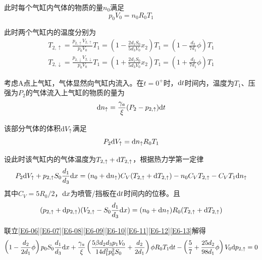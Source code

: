 \documentclass[10pt,a4paper,onecolumn,UTF8]{ctexart}
\begin{document}
	此时每个气缸内气体的物质的量$n_0$满足
	\begin{equation}\label{E6-08}
		p_0V_0=n_0R_0T_1
	\end{equation}
	
	此时两个气缸内的温度分别为
	\begin{equation}\label{E6-09}
		\begin{aligned}
			T_{2,\uparrow}=\frac{p_{2,\uparrow}V_{2,\uparrow}}{p_0V_0}T_1=\left(1-\frac{2d_1S_0}{5d_3V_0}x_2\right)T_1=\left(1-\frac{d_2}{7d_1}\phi\right)T_1\\
			T_{2,\downarrow}=\frac{p_{2,\downarrow}V_{2,\downarrow}}{p_0V_0}T_1=\left(1+\frac{2d_1S_0}{5d_3V_0}x_2\right)T_1=\left(1+\frac{d_2}{7d_1}\phi\right)T_1
		\end{aligned}
	\end{equation}
	
	考虑A点上气缸，气体显然向气缸内流入。在$t=0^+$时，$\mathrm{d} t$时间内，温度为$T_1$、压强为$P_2$的气体流入上气缸的物质的量为
	\begin{equation}\label{E6-10}
		\mathrm{d} n_{\uparrow}=\frac{\gamma_a}{\xi}(P_2-p_{2,\uparrow})\mathrm{d} t
	\end{equation}
	
	该部分气体的体积$\mathrm{d} V_{\uparrow}$满足
	\begin{equation}\label{E6-11}
		P_2\mathrm{d} V_{\uparrow}=\mathrm{d} n_{\uparrow}R_0T_1
	\end{equation}
	
	设此时该气缸内的气体温度为$T_{2,\uparrow}+\mathrm{d} T_{2,\uparrow}$，根据热力学第一定律
	\begin{equation}\label{E6-12}
		P_2\mathrm{d} V_{\uparrow}+p_{2,\uparrow}S_0\frac{d_1}{d_3}\mathrm{d} x=(n_0+\mathrm{d} n_{\uparrow})C_V(T_{2,\uparrow}+\mathrm{d} T_{2,\uparrow})-n_0C_VT_{2,\uparrow}-C_VT_1\mathrm{d} n_{\uparrow}
	\end{equation}
	其中$C_V=5R_0/2$，$\mathrm{d} x$为喷管/挡板在$\mathrm{d} t$时间内的位移。且
	\begin{equation}\label{E6-13}
		(p_{2,\uparrow}+\mathrm{d} p_{2,\uparrow})(V_{2,\uparrow}-S_0\frac{d_1}{d_3}\mathrm{d} x)=(n_0+\mathrm{d} n_{\uparrow})R_0(T_{2,\uparrow}+\mathrm{d} T_{2,\uparrow})
	\end{equation}
	
	联立\eqref{E6-06}\eqref{E6-07}\eqref{E6-08}\eqref{E6-09}\eqref{E6-10}\eqref{E6-11}\eqref{E6-12}\eqref{E6-13}解得
	\begin{equation}\label{E6-14}
		\left(1-\frac{d_2}{2d_1}\phi\right)p_0S_0\frac{d_1}{d_3}\mathrm{d} x+\frac{\gamma_a}{\xi}\left(\frac{5\beta d_2d_3p_1V_0}{14d_1^2p_0^2S_0}+\frac{d_2}{2d_1}\right)\phi R_0T_1\mathrm{d} t- \left(\frac 5 7+\frac{25d_2}{98d_1}\phi\right)V_0\mathrm{d} p_{2,\uparrow}=0
	\end{equation}
	
\end{document}

